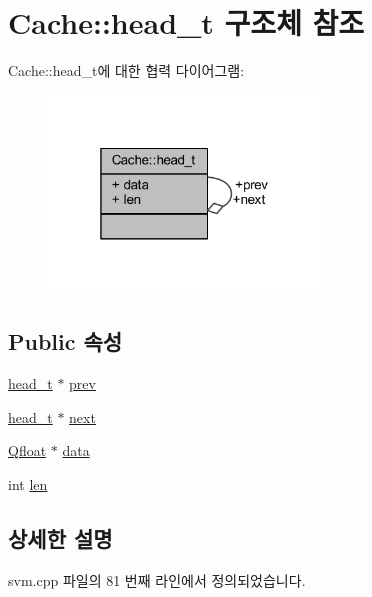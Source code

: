 \hypertarget{struct_cache_1_1head__t}{\section{Cache\+:\+:head\+\_\+t 구조체 참조}
\label{struct_cache_1_1head__t}
}


Cache\+:\+:head\+\_\+t에 대한 협력 다이어그램\+:
\nopagebreak
\begin{figure}[H]
\begin{center}
\leavevmode
\includegraphics[width=205pt]{struct_cache_1_1head__t__coll__graph}
\end{center}
\end{figure}
\subsection*{Public 속성}
\begin{DoxyCompactItemize}
\item 
\hyperlink{struct_cache_1_1head__t}{head\+\_\+t} $\ast$ \hyperlink{struct_cache_1_1head__t_a82b1a4d1a105769f85cce8d51c19860e}{prev}
\item 
\hyperlink{struct_cache_1_1head__t}{head\+\_\+t} $\ast$ \hyperlink{struct_cache_1_1head__t_aa152a104ec07250949c234d164f5f3fd}{next}
\item 
\hyperlink{svm_8cpp_a8755d90a54ecfb8d15051af3e0542592}{Qfloat} $\ast$ \hyperlink{struct_cache_1_1head__t_a630b97ea8171e7e8c1f4ff6c3b12c587}{data}
\item 
int \hyperlink{struct_cache_1_1head__t_af62eb0bc8e61b1889fef2bf7f8a0222b}{len}
\end{DoxyCompactItemize}


\subsection{상세한 설명}


svm.\+cpp 파일의 81 번째 라인에서 정의되었습니다.



